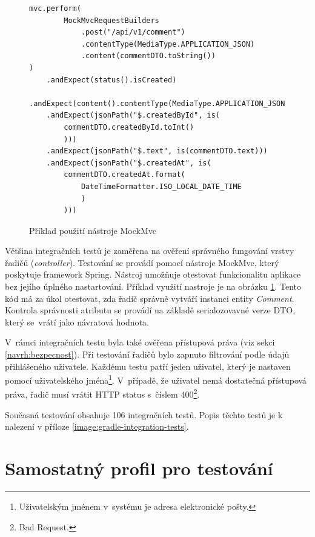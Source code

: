         \begin{figure}
        \begin{verbatim}
mvc.perform(
        MockMvcRequestBuilders
            .post("/api/v1/comment")
            .contentType(MediaType.APPLICATION_JSON)
            .content(commentDTO.toString())
)
    .andExpect(status().isCreated)
    .andExpect(content().contentType(MediaType.APPLICATION_JSON))
    .andExpect(jsonPath("$.createdById", is(
        commentDTO.createdById.toInt()
        )))
    .andExpect(jsonPath("$.text", is(commentDTO.text)))
    .andExpect(jsonPath("$.createdAt", is(
        commentDTO.createdAt.format(
            DateTimeFormatter.ISO_LOCAL_DATE_TIME
            )
        )))

        \end{verbatim}
        \caption{Příklad použití nástroje MockMvc} 
        \label{code:mockmvc}
    \end{figure}
    Většina integračních testů je zaměřena na ověření správného fungování vrstvy řadičů (\textit{controller}). Testování se provádí pomocí nástroje MockMvc, který poskytuje framework Spring.\cite{mock-mvc} Nástroj umožňuje otestovat funkcionalitu aplikace bez jejího úplného nastartování. Příklad využití nastroje je na obrázku \ref{code:mockmvc}. Tento kód má za úkol otestovat, zda řadič správně vytváří instanci entity \textit{Comment}. Kontrola správnosti atributu se provádí na základě serialozovavné verze DTO, který se~vrátí jako návratová hodnota.
    
    V~rámci integračních testu byla také ověřena přístupová práva (viz sekci \ref{navrh:bezpecnost}). Při testování řadičů bylo zapnuto filtrování podle údajů přihlášeného uživatele. Každému testu patří jeden uživatel, který je nastaven pomocí uživatelského jména\footnote{Uživatelským jménem v~systému je adresa elektronické pošty.}. V~případě, že uživatel nemá dostatečná přístupová práva, řadič musí vrátit HTTP status s~číslem 400\footnote{Bad Request.}.
    
     Současná testování obsahuje 106 integračních testů. Popis těchto testů je k nalezení v příloze \ref{image:gradle-integration-tests}.
    
\section{Samostatný profil pro testování}

